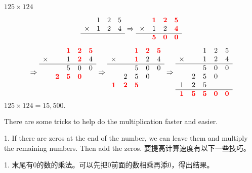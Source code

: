 \begin{example}
$125\times 124$
\end{example}
\begin{solution}
$$
\begin{array}{lccc}
&1&2&5\\
\times&1&2&4\\
\hline
&&&
\end{array}
\Rightarrow
\begin{array}{lccc}
&{\color{red} \bm 1}&{\color{red} \bm 2}&{\color{red} \bm 5}\\
\times&1&2&{\color{red} \bm 4}\\
\hline
&{\color{red} \bm 5}&{\color{red} \bm 0}&{\color{red} \bm 0}
\end{array}
$$
$$
\Rightarrow
\begin{array}{ccccc}
&&{\color{red} \bm 1}&{\color{red} \bm 2}&{\color{red} \bm 5}\\
\times&&1&{\color{red} \bm 2}&4\\
\hline
&&5&0&0\\
&{\color{red} \bm 2}&{\color{red} \bm 5}&{\color{red} \bm 0}&\\
&&&&\\
&&&&
\end{array}
\Rightarrow
\begin{array}{ccccc}
&&{\color{red} \bm 1}&{\color{red} \bm 2}&{\color{red} \bm 5}\\
\times&&{\color{red} \bm 1}&2&4\\
\hline
&&5&0&0\\
&2&5&0&\\
{\color{red} \bm 1}&{\color{red} \bm 2}&{\color{red} \bm 5}&&\\
&&&&
\end{array}
\Rightarrow
\begin{array}{ccccc}
&&1&2&5\\
\times&&1&2&4\\
\hline
&&5&0&0\\
&2&5&0&\\
1&2&5&&\\
\hline
{\color{red} \bm 1}&{\color{red} \bm 5}&{\color{red} \bm 5}&{\color{red} \bm 0}&{\color{red} \bm 0}
\end{array}
$$
$125\times 124= 15,500.$
\end{solution}

\begin{paracol}{2}
There are some tricks to help do the multiplication faster and easier.

1. If there are zeros at the end of the number, we can leave them and multiply the remaining numbers. Then add the zeros. 
\switchcolumn[1]
要提高计算速度有以下一些技巧。

1. 末尾有0的数的乘法。可以先把0前面的数相乘再添0，得出结果。
\end{paracol}

